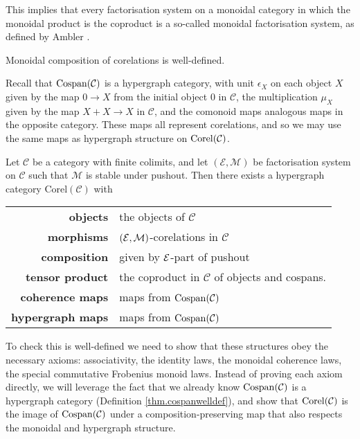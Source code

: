 This implies that every factorisation system on a monoidal category in which the
monoidal product is the coproduct is a so-called monoidal factorisation system,
as defined by Ambler \cite{Am}.
\begin{corollary}
  Monoidal composition of corelations is well-defined.
\end{corollary}




  Recall that $\operatorname{{Cospan}}(\mathcal C)$ is a hypergraph category, with unit
  $\epsilon_X$ on each object $X$ given by the map $0 \to X$ from the initial
  object $0$ in $\mathcal C$, the multiplication $\mu_X$ given by the map $X+X
  \to X$ in $\mathcal C$, and the comonoid maps analogous maps in the opposite
  category. These maps all represent corelations, and so we may use the same maps as
  hypergraph structure on $\operatorname{{Corel}}(\mathcal C)$.   

\begin{theorem} \label{thm.cospantocorel}
  Let $\mathcal C$ be a category with finite colimits, and let $(\mathcal E,
  \mathcal M)$ be factorisation system on $\mathcal C$ such that $\mathcal M$ is
  stable under pushout. Then there exists a hypergraph category
  $\mathrm{Corel}(\mathcal C)$ with 
  
  \begin{tabular}{ r p{}}
    \textbf{objects} & the objects of $\mathcal C$ \\ 
    \textbf{morphisms} & $(\mathcal E,\mathcal M)$-corelations in $\mathcal C$\\ 
  \textbf{composition} & given by $\mathcal E$-part of pushout \\
  \textbf{tensor product} & the coproduct in $\mathcal C$ of objects and cospans. \\
  \textbf{coherence maps} & maps from $\operatorname{{Cospan}}(\mathcal C)$  \\
  \textbf{hypergraph maps} & maps from $\operatorname{{Cospan}}(\mathcal C)$
  \end{tabular}
\end{theorem}

To check this is well-defined we need to show that these structures obey the
necessary axioms: associativity, the identity laws, the monoidal coherence laws,
the special commutative Frobenius monoid laws. Instead of proving each axiom
directly, we will leverage the fact that we already know $\operatorname{{Cospan}}(\mathcal C)$ is a
hypergraph category (Definition \ref{thm.cospanwelldef}), and show that
$\operatorname{{Corel}}(\mathcal C)$ is the image of $\operatorname{{Cospan}}(\mathcal C)$ under a composition-preserving
map that also respects the monoidal and hypergraph structure.

